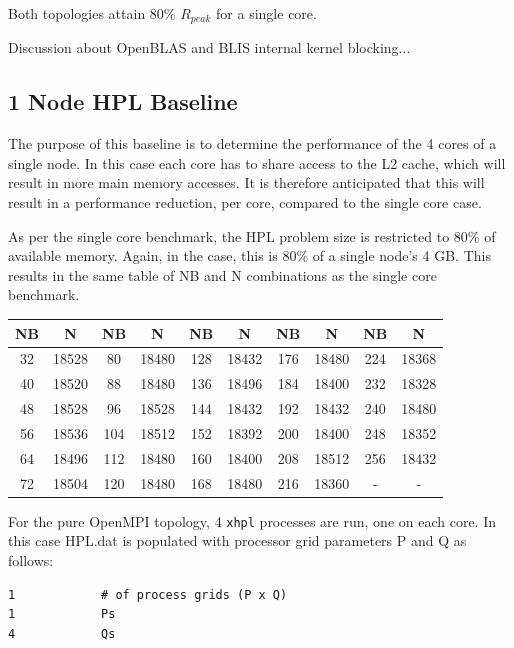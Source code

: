 \documentclass{report}
\begin{document}
Both topologies attain 80\% $R_{peak}$ for a single core.

Discussion about OpenBLAS and BLIS internal kernel blocking...


%
%
\subsection{1 Node HPL Baseline}

The purpose of this baseline is to determine the performance of the 4 cores of a single node. In this case each core has to share access to the L2 cache, which will result in more main memory accesses. It is therefore anticipated that this will result in a performance reduction, per core, compared to the single core case.

As per the single core benchmark, the HPL problem size is restricted to 80\% of available memory. Again, in the case, this is 80\% of a single node's 4 GB. This results in the same table of NB and N combinations as the single core benchmark.

\begin{center}
	\begin{tabular}{ |c|c|c|c|c|c|c|c|c|c| } 
		\hline
		NB & N & NB & N & NB & N & NB & N & NB & N \\ 
		\hline
		32 & 18528 &  80 & 18480 & 128 & 18432 & 176 & 18480 & 224 & 18368 \\ 
		40 & 18520 &  88 & 18480 & 136 & 18496 & 184 & 18400 & 232 & 18328 \\ 
 		48 & 18528 &  96 & 18528 & 144 & 18432 & 192 & 18432 & 240 & 18480 \\
		56 & 18536 & 104 & 18512 & 152 & 18392 & 200 & 18400 & 248 & 18352 \\ 
 		64 & 18496 & 112 & 18480 & 160 & 18400 & 208 & 18512 & 256 & 18432 \\
		72 & 18504 & 120 & 18480 & 168 & 18480 & 216 & 18360 &   - &     - \\ 
 		\hline
	\end{tabular}
\end{center}

For the pure OpenMPI topology, 4 \verb|xhpl| processes are run, one on each core. In this case HPL.dat is populated with processor grid parameters P and Q as follows:

\lstset{style=listing}
\begin{lstlisting}[numbers=none]
1            # of process grids (P x Q)
1            Ps
4            Qs
\end{lstlisting}
\end{document}
